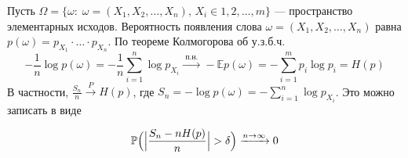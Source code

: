 \begin{ordre}
Пусть $\Omega=\{ \omega:\; \omega=(X_1,X_2,\ldots, X_n),\, X_i\in 1,2,\ldots,m\}$ --- пространство элементарных исходов. 
Вероятность появления слова $\omega=(X_1,X_2,\ldots, X_n)$ равна $p(\omega)=p_{X_1}\cdot\ldots\cdot p_{X_n}$. По теореме Колмогорова об 
у.з.б.ч. 
$$
-\frac{1}{n}\log p(\omega)=-\frac{1}{n}\sum\limits_{i=1}^{n}\log p_{X_i} \xrightarrow{\text{ п.н. }} 
-{\mathbb E}p(\omega)=-\sum\limits_{i=1}^{m}p_i\log p_i=H(p) 
$$
В частности, $\frac{S_n}{n}\xrightarrow{P}H(p)$, где $S_n=-\log p(\omega)=-\sum\limits_{i=1}^{n}\log p_{X_i}$. Это можно записать в виде 

$$
{\mathbb P}\Bigl( \Bigl| \frac{S_n-nH(p)}{n}\Bigr|>\delta \Bigr)  \xrightarrow{n\to\infty} 0 
$$
\end{ordre}

\begin{comment}

\begin{problem}[о шляпах Тода Эберта (1998) ]

Трех игроков отводят в комнату, где на них надевают (случайно и независимо) белые и черные шляпы. Каждый видит 
цвет других шляп и должен написать на бумажке одно из трех слов: <<белый>>, <<черный>>, <<пас>> 
(не советуясь с другими и не показывая им свою бумажку). Команда выигрывает, если хотя бы один из игроков назвал правильный 
цвет своей шляпы и ни один не назвал неправильного. Как им сговориться, чтобы увеличить шансы? 
Решите эту же задачу, если игроков $n=2^m -1$ $( m\in {\mathbb N} )$. 
\end{problem}

\begin{ordre}
Воспользуйтесь понятием кода Хемминга.
\end{ordre}

\begin{remark}
Докажем для случая трех игроков, что стратегий лучше (вероятность выигрыша больше  $ \frac{3}{4}$) не бывает . 

Единственная информация, которой владеет $i$-й игрок --- это цвета шляп двух других. Поэтому стратегия для $i$-го игрока должна зависеть 
только от этих двух цветов. В каждом случае имется три варианта ответа для игрока: $0$, $1$ или <<пас>>, т.е. всего $3^{12}$ различных 
стратегий. Поскольку есть $8$ вариантов расположения шляп на игроках, более выгодная стратегия должна обеспечивать выигрыш в $7$ вариантах. 
Тогда один из игроков должен угадать свой цвет в $3$ ситуациях. Значит, имеются для него ответы $\alpha_{i_1 j_1}$, 
$\alpha_{i_2 j_2}$, не являющиеся пасами. Но тогда в ситуациях $\overline{\alpha_{i_1 j_1}} i_1 j_1$ и 
$\overline{\alpha_{i_2 j_2}} i_2 j_2$ он ошибется, что противоречит предположению о $7$ выигрышных ситуациях. 

Таким образом, максимальная вероятность выигрыша равна $\frac{3}{4}$. 

\end{remark}

\end{comment}

